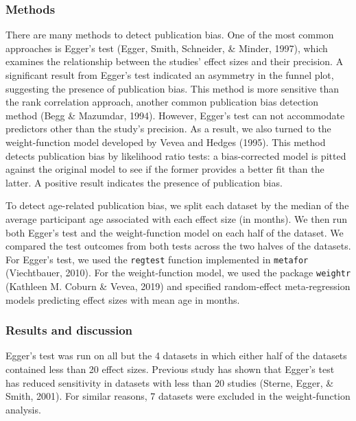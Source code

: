 \documentclass[
  man]{apa6}
\begin{document}
\hypertarget{methods-1}{%
\subsubsection{Methods}\label{methods-1}}

There are many methods to detect publication bias. One of the most common approaches is Egger's test (Egger, Smith, Schneider, \& Minder, 1997), which examines the relationship between the studies' effect sizes and their precision. A significant result from Egger's test indicated an asymmetry in the funnel plot, suggesting the presence of publication bias. This method is more sensitive than the rank correlation approach, another common publication bias detection method (Begg \& Mazumdar, 1994). However, Egger's test can not accommodate predictors other than the study's precision. As a result, we also turned to the weight-function model developed by Vevea and Hedges (1995). This method detects publication bias by likelihood ratio tests: a bias-corrected model is pitted against the original model to see if the former provides a better fit than the latter. A positive result indicates the presence of publication bias.

To detect age-related publication bias, we split each dataset by the median of the average participant age associated with each effect size (in months). We then run both Egger's test and the weight-function model on each half of the dataset. We compared the test outcomes from both tests across the two halves of the datasets. For Egger's test, we used the \texttt{regtest} function implemented in \texttt{metafor} (Viechtbauer, 2010). For the weight-function model, we used the package \texttt{weightr} (Kathleen M. Coburn \& Vevea, 2019) and specified random-effect meta-regression models predicting effect sizes with mean age in months.

\hypertarget{results-and-discussion}{%
\subsubsection{Results and discussion}\label{results-and-discussion}}

Egger's test was run on all but the 4 datasets in which either half of the datasets contained less than 20 effect sizes. Previous study has shown that Egger's test has reduced sensitivity in datasets with less than 20 studies (Sterne, Egger, \& Smith, 2001). For similar reasons, 7 datasets were excluded in the weight-function analysis.
\end{document}
